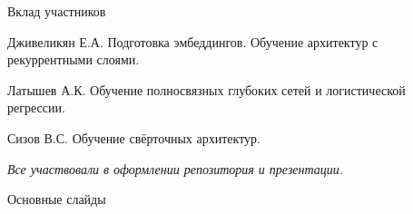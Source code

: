\documentclass[c, aspectratio = 43]{beamer}
\begin{document}
\begin{frame}{Вклад участников}

	\begin{block}{Дживеликян Е.А.}
		Подготовка эмбеддингов. Обучение архитектур с рекуррентными слоями.
	\end{block}

	\begin{block}{Латышев А.К.}
		Обучение полносвязных глубоких сетей и логистической регрессии.
	\end{block}
	
	\begin{block}{Сизов В.С.}
		Обучение свёрточных архитектур. 
	\end{block}

	\vfill
	\textit{Все участвовали в оформлении репозитория и презентации.}

\end{frame}



\beamertemplatenavigationsymbolsempty
\begin{frame}[noframenumbering]{Основные слайды}
	\hypertarget{toc}{}
	\tableofcontents[part=1]
\end{frame}
\end{document}
